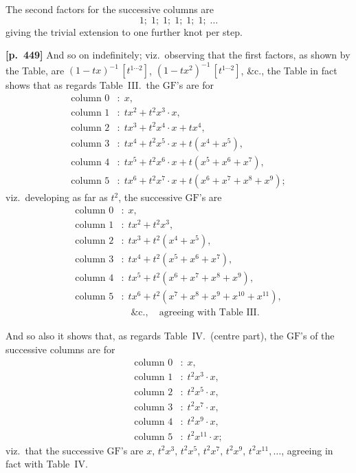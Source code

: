 \documentclass[11pt,a4paper]{article}
\providecommand{\GF}{\mathrm{GF}}
\begin{document}
The second factors for the successive columns are
\[
1;\; 1;\; 1;\; 1;\; 1;\; 1;\; \ldots
\]
giving the trivial extension to one further knot per step.

\bigskip
\noindent\textbf{[p.~449]}\quad
And so on indefinitely; viz.\ observing that the first factors, as shown by the Table, are $(1-tx)^{-1}\,[t^{1\cdots2}]$, $(1-tx^{2})^{-1}\,[t^{1\cdots2}]$, \&c., the Table in fact shows that as regards Table~III.\ the $\GF$'s are for
\[
\begin{aligned}
\text{column } 0 &:\; x,\\
\text{column } 1 &:\; tx^{2} + t^{2}x^{3}\cdot x,\\
\text{column } 2 &:\; tx^{3} + t^{2}x^{4}\cdot x + tx^{4},\\
\text{column } 3 &:\; tx^{4} + t^{2}x^{5}\cdot x + t(x^{4}+x^{5}),\\
\text{column } 4 &:\; tx^{5} + t^{2}x^{6}\cdot x + t(x^{5}+x^{6}+x^{7}),\\
\text{column } 5 &:\; tx^{6} + t^{2}x^{7}\cdot x + t(x^{6}+x^{7}+x^{8}+x^{9});
\end{aligned}
\]
viz.\ developing as far as $t^{2}$, the successive $\GF$'s are
\[
\begin{aligned}
\text{column } 0 &:\; x,\\
\text{column } 1 &:\; tx^{2} + t^{2}x^{3},\\
\text{column } 2 &:\; tx^{3} + t^{2}(x^{4}+x^{5}),\\
\text{column } 3 &:\; tx^{4} + t^{2}(x^{5}+x^{6}+x^{7}),\\
\text{column } 4 &:\; tx^{5} + t^{2}(x^{6}+x^{7}+x^{8}+x^{9}),\\
\text{column } 5 &:\; tx^{6} + t^{2}(x^{7}+x^{8}+x^{9}+x^{10}+x^{11}),\\
&\quad\&\mathrm{c.,}\quad\text{agreeing with Table~III.}
\end{aligned}
\]

And so also it shows that, as regards Table~IV.\ (centre part), the $\GF$'s of the successive columns are for
\[
\begin{aligned}
\text{column } 0 &:\; x,\\
\text{column } 1 &:\; t^{2}x^{3}\cdot x,\\
\text{column } 2 &:\; t^{2}x^{5}\cdot x,\\
\text{column } 3 &:\; t^{2}x^{7}\cdot x,\\
\text{column } 4 &:\; t^{2}x^{9}\cdot x,\\
\text{column } 5 &:\; t^{2}x^{11}\cdot x;
\end{aligned}
\]
viz.\ that the successive $\GF$'s are $x,\,t^{2}x^{3},\,t^{2}x^{5},\,t^{2}x^{7},\,t^{2}x^{9},\,t^{2}x^{11},\ldots$, agreeing in fact with Table~IV.
\end{document}
